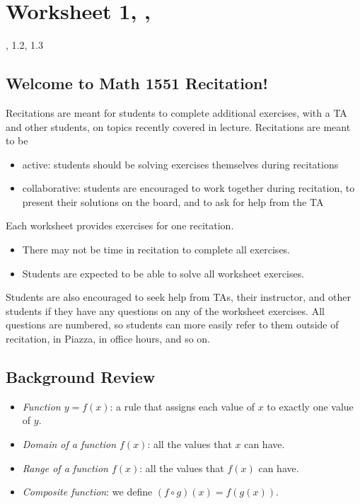 \newpage\section*{Worksheet 1, \Course, \Semester} 
\noindent {}, 1.2, 1.3

\subsection*{Welcome to Math 1551 Recitation!} 
    
    Recitations are meant for students to complete additional exercises, with a TA and other students, on topics recently covered in lecture. Recitations are meant to be
    \begin{itemize}
        \item active: students should be solving exercises themselves during recitations
        \item collaborative: students are encouraged to work together during recitation, to present their solutions on the board, and to ask for help from the TA
    \end{itemize}

Each worksheet provides exercises for one recitation.
    \begin{itemize}
        \item There may not be time in recitation to complete all exercises. 
        \item Students are expected to be able to solve all worksheet exercises.
    \end{itemize}
    
    Students are also encouraged to seek help from TAs, their instructor, and other students if they have any questions on any of the worksheet exercises. All questions are numbered, so students can more easily refer to them outside of recitation, in Piazza, in office hours, and so on.

\subsection*{Background Review}
\begin{itemize}
	\item \emph{Function $y = f(x)$}: a rule that assigns each value of $x$ to exactly one value of $y$.
	\item \emph{Domain of a function $f(x)$}: all the values that $x$ can have. 
	\item \emph{Range of a function $f(x)$}: all the values that $f(x)$ can have. 
	\item \emph{Composite function}: we define $(f \circ g)(x) = f (g(x))$.
\end{itemize}

